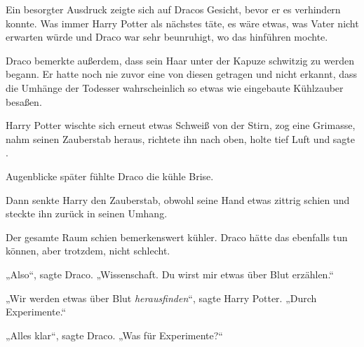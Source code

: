 Ein besorgter Ausdruck zeigte sich auf Dracos Gesicht, bevor er es verhindern konnte. Was immer Harry Potter als nächstes täte, es wäre etwas, was Vater nicht erwarten würde und Draco war sehr beunruhigt, wo das hinführen mochte.

Draco bemerkte außerdem, dass sein Haar unter der Kapuze schwitzig zu werden begann. Er hatte noch nie zuvor eine von diesen getragen und nicht erkannt, dass die Umhänge der Todesser wahrscheinlich so etwas wie eingebaute Kühlzauber besaßen.

Harry Potter wischte sich erneut etwas Schweiß von der Stirn, zog eine Grimasse, nahm seinen Zauberstab heraus, richtete ihn nach oben, holte tief Luft und sagte .

Augenblicke später fühlte Draco die kühle Brise.


Dann senkte Harry den Zauberstab, obwohl seine Hand etwas zittrig schien und steckte ihn zurück in seinen Umhang.

Der gesamte Raum schien bemerkenswert kühler. Draco hätte das ebenfalls tun können, aber trotzdem, nicht schlecht.

„Also“, sagte Draco. „Wissenschaft. Du wirst mir etwas über Blut erzählen.“

„Wir werden etwas über Blut \emph{herausfinden}“, sagte Harry Potter. „Durch Experimente.“

„Alles klar“, sagte Draco. „Was für Experimente?“

